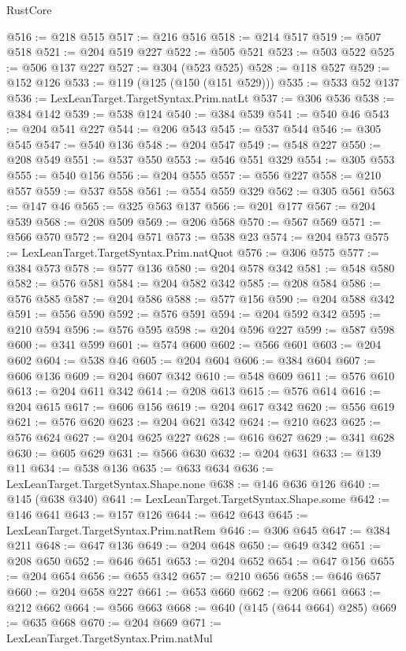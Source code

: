 \begin{lexlean}{RustCore}
\begin{coremodule}
@516 := @218 @515
@517 := @216 @516
@518 := @214 @517
@519 := @507 @518
@521 := @204 @519 @227
@522 := @505 @521
@523 := @503 @522
@525 := @506 @137 @227
@527 := @304 (@523 @525)
@528 := @118 @527
@529 := @152 @126
@533 := @119 (@125 (@150 (@151 @529)))
@535 := @533 @52 @137
@536 := LexLeanTarget.TargetSyntax.Prim.natLt
@537 := @306 @536
@538 := @384 @142
@539 := @538 @124
@540 := @384 @539
@541 := @540 @46
@543 := @204 @541 @227
@544 := @206 @543
@545 := @537 @544
@546 := @305 @545
@547 := @540 @136
@548 := @204 @547
@549 := @548 @227
@550 := @208 @549
@551 := @537 @550
@553 := @546 @551 @329
@554 := @305 @553
@555 := @540 @156
@556 := @204 @555
@557 := @556 @227
@558 := @210 @557
@559 := @537 @558
@561 := @554 @559 @329
@562 := @305 @561
@563 := @147 @46
@565 := @325 @563 @137
@566 := @201 @177
@567 := @204 @539
@568 := @208 @509
@569 := @206 @568
@570 := @567 @569
@571 := @566 @570
@572 := @204 @571
@573 := @538 @23
@574 := @204 @573
@575 := LexLeanTarget.TargetSyntax.Prim.natQuot
@576 := @306 @575
@577 := @384 @573
@578 := @577 @136
@580 := @204 @578 @342
@581 := @548 @580
@582 := @576 @581
@584 := @204 @582 @342
@585 := @208 @584
@586 := @576 @585
@587 := @204 @586
@588 := @577 @156
@590 := @204 @588 @342
@591 := @556 @590
@592 := @576 @591
@594 := @204 @592 @342
@595 := @210 @594
@596 := @576 @595
@598 := @204 @596 @227
@599 := @587 @598
@600 := @341 @599
@601 := @574 @600
@602 := @566 @601
@603 := @204 @602
@604 := @538 @46
@605 := @204 @604
@606 := @384 @604
@607 := @606 @136
@609 := @204 @607 @342
@610 := @548 @609
@611 := @576 @610
@613 := @204 @611 @342
@614 := @208 @613
@615 := @576 @614
@616 := @204 @615
@617 := @606 @156
@619 := @204 @617 @342
@620 := @556 @619
@621 := @576 @620
@623 := @204 @621 @342
@624 := @210 @623
@625 := @576 @624
@627 := @204 @625 @227
@628 := @616 @627
@629 := @341 @628
@630 := @605 @629
@631 := @566 @630
@632 := @204 @631
@633 := @139 @11
@634 := @538 @136
@635 := @633 @634
@636 := LexLeanTarget.TargetSyntax.Shape.none
@638 := @146 @636 @126
@640 := @145 (@638 @340)
@641 := LexLeanTarget.TargetSyntax.Shape.some
@642 := @146 @641
@643 := @157 @126
@644 := @642 @643
@645 := LexLeanTarget.TargetSyntax.Prim.natRem
@646 := @306 @645
@647 := @384 @211
@648 := @647 @136
@649 := @204 @648
@650 := @649 @342
@651 := @208 @650
@652 := @646 @651
@653 := @204 @652
@654 := @647 @156
@655 := @204 @654
@656 := @655 @342
@657 := @210 @656
@658 := @646 @657
@660 := @204 @658 @227
@661 := @653 @660
@662 := @206 @661
@663 := @212 @662
@664 := @566 @663
@668 := @640 (@145 (@644 @664) @285)
@669 := @635 @668
@670 := @204 @669
@671 := LexLeanTarget.TargetSyntax.Prim.natMul

\end{coremodule}
\end{lexlean}
